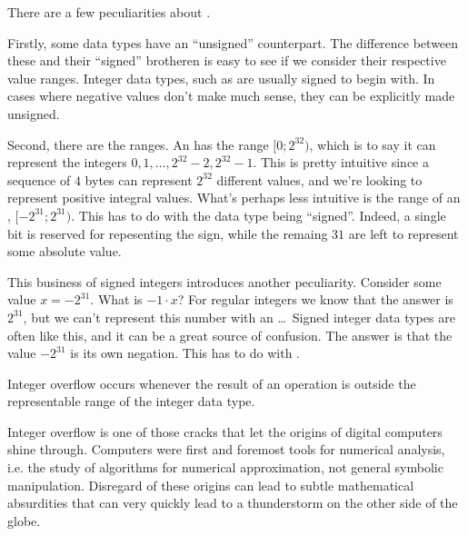 There are a few peculiarities about .

Firstly, some data types have an ``unsigned'' counterpart. The difference
between these and their ``signed'' brotheren is easy to see if we consider
their respective value ranges. Integer data types, such as are usually signed
to begin with. In cases where negative values don't make much sense, they can
be explicitly made unsigned.

Second, there are the ranges. An  has the range
$[0;2^{32})$, which is to say it can represent the integers
$0,1,\ldots,2^{32}-2,2^{32}-1$. This is pretty intuitive since a sequence of
$4$ bytes can represent $2^{32}$ different values, and we're looking to
represent positive integral values. What's perhaps less intuitive is the range
of an , $[-2^{31};2^{31})$. This has to do with the data type being
``signed''. Indeed, a single bit is reserved for repesenting the sign, while
the remaing $31$ are left to represent some absolute value.

This business of signed integers introduces another peculiarity. Consider some
 value $x=-2^{31}$. What is $-1\cdot x$? For regular integers we know
that the answer is $2^{31}$, but we can't represent this number with an
\ldots\ Signed integer data types are often  like
this, and it can be a great source of confusion. The answer is that the
 value $-2^{31}$ is its own negation. This has to do with
.

\begin{definition}

Integer overflow occurs whenever the result of an operation is outside the
representable range of the integer data type.

\end{definition}

Integer overflow is one of those cracks that let the origins of digital
computers shine through. Computers were first and foremost tools for numerical
analysis, i.e.  the study of algorithms for numerical approximation, not
general symbolic manipulation. Disregard of these origins can lead to subtle
mathematical absurdities that can very quickly lead to a thunderstorm on the
other side of the globe.

